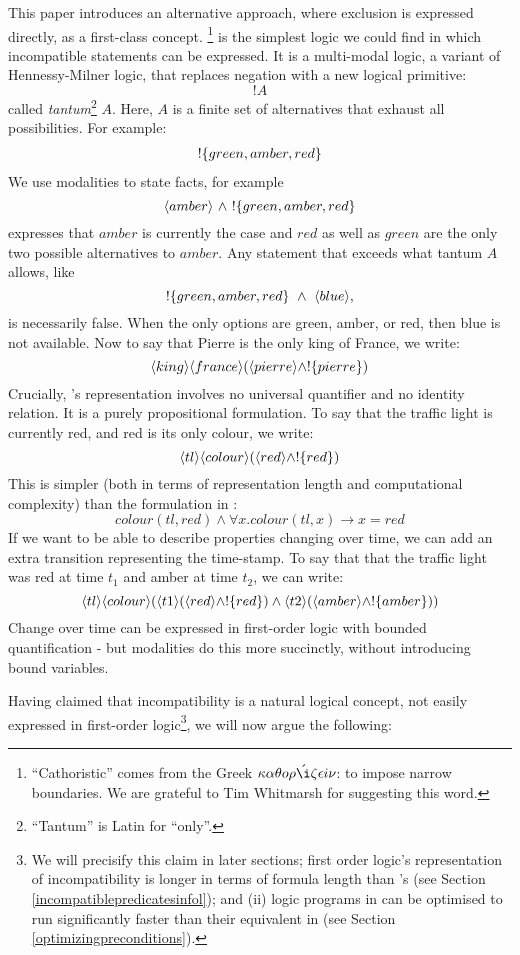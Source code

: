 This paper introduces an alternative approach, where
exclusion is expressed directly, as a first-class concept.
 \Cathoristic{}\footnote{``Cathoristic'' comes from the Greek
  $\kappa \alpha \theta o \rho \acute{\i} \zeta \epsilon i \nu$: to impose narrow
  boundaries. We are grateful to Tim Whitmarsh for suggesting this
  word.} is the simplest logic we could find in which incompatible
statements can be expressed.  
It is a multi-modal logic, a variant of Hennessy-Milner logic,
that replaces negation with a new logical primitive:
\[
   !A
\]
called \emph{tantum}\footnote{``Tantum'' is Latin for ``only''.} $A$. Here, $A$ is a finite set of alternatives
that exhaust all possibilities.  For example:
\begin{eqnarray*}
! \{green, amber, red\}
\end{eqnarray*}
We use modalities to state  facts, for example
\[
   \langle amber \rangle\ \land\ !\{green, amber, red\} 
\]
expresses that $amber$ is currently the case and $red$ as well as
$green$ are the only two possible alternatives to $amber$.  Any
statement that exceeds what tantum $A$ allows, like
\[
   !\{green, amber, red\}\ \AND\ \MAY{blue},
\]
is necessarily false.  When the only options are green, amber, or red,
then blue is not available.  Now to say that Pierre is the only king
of France, we write:
\[
\langle king \rangle \langle france \rangle (\langle pierre \rangle \land ! \{pierre\})
\]
Crucially, \cathoristic{}'s representation involves no
universal quantifier and no identity relation.  It is a purely
propositional formulation.  To say that the traffic
light is currently red, and red is its only colour, we write:
\[
\langle tl \rangle \langle colour \rangle (\langle red \rangle \land !\{red\})
\]
This is simpler (both in terms of representation length and
computational complexity) than the formulation in \fol{}:
\[
colour(tl, red) \land \forall x . colour(tl, x) \rightarrow x = red
\]
If we want to be able to describe properties changing over time, we
can add an extra transition representing the time-stamp.  To say that
that the traffic light was red at time $t_1$ and amber at time $t_2$,
we can write:
\[
   \langle tl \rangle \langle colour \rangle (\langle t1 \rangle (\langle red \rangle \land !\{red\}) \land \langle t2 \rangle (\langle amber \rangle \land !\{amber\}))
\]
Change over time can be expressed in first-order logic with bounded
quantification - but modalities do this more succinctly, without introducing bound variables.

Having claimed that incompatibility is a natural logical concept, not
easily expressed in first-order logic\footnote{We will precisify this
  claim in later sections; first order logic's representation of
  incompatibility is longer in terms of formula length than \cathoristic{}'s (see
  Section \ref{incompatiblepredicatesinfol}); and (ii) logic programs
  in \cathoristic{} can be optimised to run significantly faster than their
  equivalent in \fol{} (see Section \ref{optimizingpreconditions}).}, we
will now argue the following:

